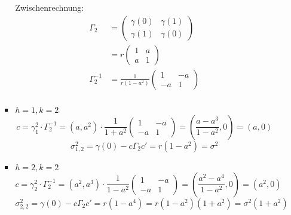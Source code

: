 \documentclass[a4paper,11pt,notitlepage,fullpage]{article}
\begin{document}
\begin{enumerate}
\begin{enumerate}
\begin{itemize}
Zwischenrechnung: 
\begin{align*}
\Gamma_2 &= \begin{pmatrix}
\gamma(0) & \gamma(1) \\
\gamma(1) & \gamma(0)
\end{pmatrix} \\
&= r\begin{pmatrix}
1 & a \\
a & 1
\end{pmatrix} \\
\Gamma_2^{-1} &= \frac{1}{r(1 - a^2)} \begin{pmatrix}
1 & -a \\
-a & 1
\end{pmatrix} \\
\end{align*}

\item $h = 1, k = 2$
$$
c = \gamma_1^2 \cdot \Gamma_2^{-1} =  (a, a^2) \cdot \frac{1}{1 + a^2}\begin{pmatrix}
1 & -a \\
-a & 1
\end{pmatrix} = (\frac{a-a^3}{1-a^2}, 0) = (a, 0)
$$$$
\sigma_{1,2}^2 = \gamma(0) - c\Gamma_2 c' = r(1-a^2) = \sigma^2
$$

\item $h = 2, k = 2$
$$
c = \gamma_2^2 \cdot \Gamma_2^{-1} =  (a^2, a^3) \cdot \frac{1}{1 - a^2}\begin{pmatrix}
1 & -a \\
-a & 1
\end{pmatrix} = (\frac{a^2-a^4}{1-a^2}, 0) = (a^2, 0)
$$$$
\sigma_{2,2}^2 = \gamma(0) - c\Gamma_2 c' = r(1-a^4) = r(1-a^2)(1+a^2) = \sigma^2(1+a^2)
$$

\end{itemize}









\end{enumerate}




\end{enumerate}
\end{document}

